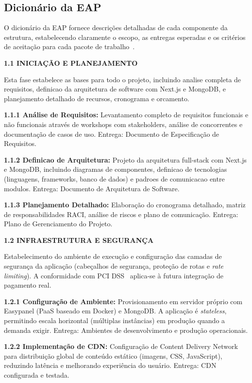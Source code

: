 \subsection{Dicionário da EAP}

O dicionário da EAP fornece descrições detalhadas de cada componente da estrutura, estabelecendo claramente o escopo, as entregas esperadas e os critérios de aceitação para cada pacote de trabalho~\cite{Verzuh:2021}.

\textbf{1.1 INICIAÇÃO E PLANEJAMENTO}

Esta fase estabelece as bases para todo o projeto, incluindo analise completa de requisitos, definicao da arquitetura de software com Next.js e MongoDB, e planejamento detalhado de recursos, cronograma e orcamento.

\textbf{1.1.1 Análise de Requisitos:} Levantamento completo de requisitos funcionais e não funcionais através de workshops com stakeholders, análise de concorrentes e documentação de casos de uso. Entrega: Documento de Especificação de Requisitos.

\textbf{1.1.2 Definicao de Arquitetura:} Projeto da arquitetura full-stack com Next.js e MongoDB, incluindo diagramas de componentes, definicao de tecnologias (linguagens, frameworks, banco de dados) e padroes de comunicacao entre modulos. Entrega: Documento de Arquitetura de Software.

\textbf{1.1.3 Planejamento Detalhado:} Elaboração do cronograma detalhado, matriz de responsabilidades RACI, análise de riscos e plano de comunicação. Entrega: Plano de Gerenciamento do Projeto.

\textbf{1.2 INFRAESTRUTURA E SEGURANÇA}

Estabelecimento do ambiente de execução e configuração das camadas de segurança da aplicação (cabeçalhos de segurança, proteção de rotas e \textit{rate limiting}). A conformidade com PCI DSS~\cite{PCIDSS:2022} aplica-se à futura integração de pagamento real.

\textbf{1.2.1 Configuração de Ambiente:} Provisionamento em servidor próprio com Easypanel (PaaS baseado em Docker) e MongoDB. A aplicação é \textit{stateless}, permitindo escala horizontal (múltiplas instâncias) em produção quando a demanda exigir. Entrega: Ambientes de desenvolvimento e produção operacionais.

\textbf{1.2.2 Implementação de CDN:} Configuração de Content Delivery Network para distribuição global de conteúdo estático (imagens, CSS, JavaScript), reduzindo latência e melhorando experiência do usuário. Entrega: CDN configurada e testada.

